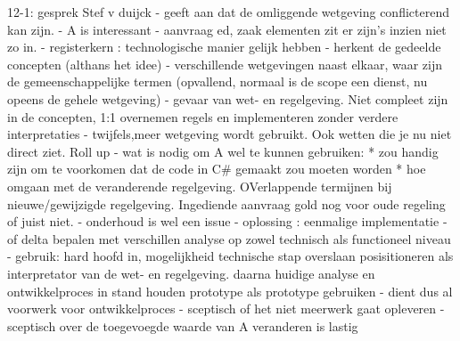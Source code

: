 12-1: gesprek Stef v duijck
- geeft aan dat de omliggende wetgeving conflicterend kan zijn.
- A is interessant
- aanvraag ed, zaak elementen zit er zijn's inzien niet zo in.
- registerkern : technologische manier gelijk hebben
- herkent de gedeelde concepten (althans het idee)
- verschillende wetgevingen naast elkaar, waar zijn de gemeenschappelijke termen (opvallend, normaal is de scope een dienst, nu opeens de gehele wetgeving)
- gevaar van wet- en regelgeving. Niet compleet zijn in de concepten, 1:1 overnemen regels en implementeren zonder verdere interpretaties
- twijfels,meer wetgeving wordt gebruikt. Ook wetten die je nu niet direct ziet. Roll up
- wat is nodig om A wel te kunnen  gebruiken:
* zou handig zijn om te voorkomen dat de code in C\# gemaakt zou moeten worden
* hoe omgaan met de veranderende regelgeving. OVerlappende termijnen bij nieuwe/gewijzigde regelgeving. Ingediende aanvraag gold nog voor oude regeling of juist niet.
- onderhoud is wel een issue
- oplossing : eenmalige implementatie
- of delta bepalen met verschillen analyse op zowel technisch als functioneel niveau
- gebruik: hard hoofd in, 
mogelijkheid technische stap overslaan
posisitioneren als interpretator van de wet- en regelgeving.
daarna huidige analyse en ontwikkelproces in stand houden
prototype als prototype gebruiken
- dient dus al voorwerk voor ontwikkelproces 
- sceptisch of het niet meerwerk gaat opleveren
- sceptisch over de toegevoegde waarde van A
veranderen is lastig